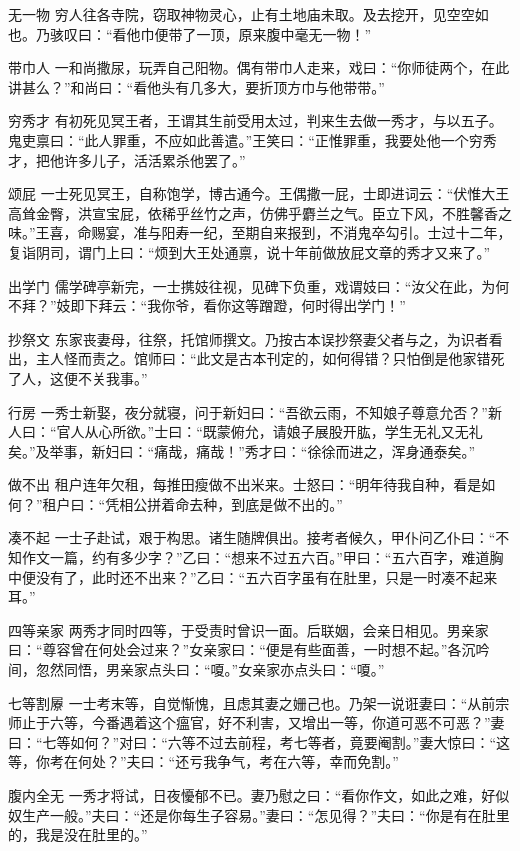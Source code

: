\documentclass[12pt,UTF8]{ctexbook}
\begin{document}
无一物
穷人往各寺院，窃取神物灵心，止有土地庙未取。及去挖开，见空空如也。乃骇叹曰：“看他巾便带了一顶，原来腹中毫无一物！”

带巾人
一和尚撒尿，玩弄自己阳物。偶有带巾人走来，戏曰：“你师徒两个，在此讲甚么？”和尚曰：“看他头有几多大，要折顶方巾与他带带。”

穷秀才
有初死见冥王者，王谓其生前受用太过，判来生去做一秀才，与以五子。鬼吏禀曰：“此人罪重，不应如此善遣。”王笑曰：“正惟罪重，我要处他一个穷秀才，把他许多儿子，活活累杀他罢了。”

颂屁
一士死见冥王，自称饱学，博古通今。王偶撒一屁，士即进词云：“伏惟大王高耸金臀，洪宣宝屁，依稀乎丝竹之声，仿佛乎麝兰之气。臣立下风，不胜馨香之味。”王喜，命赐宴，准与阳寿一纪，至期自来报到，不消鬼卒勾引。士过十二年，复诣阴司，谓门上曰：“烦到大王处通禀，说十年前做放屁文章的秀才又来了。”

出学门
儒学碑亭新完，一士携妓往视，见碑下负重，戏谓妓曰：“汝父在此，为何不拜？”妓即下拜云：“我你爷，看你这等蹭蹬，何时得出学门！”

抄祭文
东家丧妻母，往祭，托馆师撰文。乃按古本误抄祭妻父者与之，为识者看出，主人怪而责之。馆师曰：“此文是古本刊定的，如何得错？只怕倒是他家错死了人，这便不关我事。”

行房
一秀士新娶，夜分就寝，问于新妇曰：“吾欲云雨，不知娘子尊意允否？”新人曰：“官人从心所欲。”士曰：“既蒙俯允，请娘子展股开肱，学生无礼又无礼矣。”及举事，新妇曰：“痛哉，痛哉！”秀才曰：“徐徐而进之，浑身通泰矣。”

做不出
租户连年欠租，每推田瘦做不出米来。士怒曰：“明年待我自种，看是如何？”租户曰：“凭相公拼着命去种，到底是做不出的。”

凑不起
一士子赴试，艰于构思。诸生随牌俱出。接考者候久，甲仆问乙仆曰：“不知作文一篇，约有多少字？”乙曰：“想来不过五六百。”甲曰：“五六百字，难道胸中便没有了，此时还不出来？”乙曰：“五六百字虽有在肚里，只是一时凑不起来耳。”

四等亲家
两秀才同时四等，于受责时曾识一面。后联姻，会亲日相见。男亲家曰：“尊容曾在何处会过来？”女亲家曰：“便是有些面善，一时想不起。”各沉吟间，忽然同悟，男亲家点头曰：“嗄。”女亲家亦点头曰：“嗄。”

七等割屪
一士考末等，自觉惭愧，且虑其妻之姗己也。乃架一说诳妻曰：“从前宗师止于六等，今番遇着这个瘟官，好不利害，又增出一等，你道可恶不可恶？”妻曰：“七等如何？”对曰：“六等不过去前程，考七等者，竟要阉割。”妻大惊曰：“这等，你考在何处？”夫曰：“还亏我争气，考在六等，幸而免割。”

腹内全无
一秀才将试，日夜懮郁不已。妻乃慰之曰：“看你作文，如此之难，好似奴生产一般。”夫曰：“还是你每生子容易。”妻曰：“怎见得？”夫曰：“你是有在肚里的，我是没在肚里的。”
\end{document}
